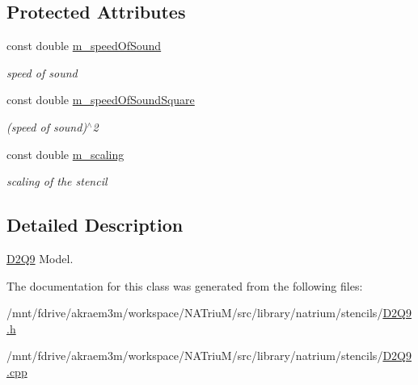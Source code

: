 \subsection*{Protected Attributes}
\begin{DoxyCompactItemize}
\item 
\hypertarget{classnatrium_1_1D2Q9_a056f2b554e1f2c8983a063096b9ebc5a}{
const double \hyperlink{classnatrium_1_1D2Q9_a056f2b554e1f2c8983a063096b9ebc5a}{m\_\-speedOfSound}}
\label{classnatrium_1_1D2Q9_a056f2b554e1f2c8983a063096b9ebc5a}

\begin{DoxyCompactList}\small\item\em speed of sound \item\end{DoxyCompactList}\item 
\hypertarget{classnatrium_1_1D2Q9_ad6ddec011506268204c2b2bd6fea58b8}{
const double \hyperlink{classnatrium_1_1D2Q9_ad6ddec011506268204c2b2bd6fea58b8}{m\_\-speedOfSoundSquare}}
\label{classnatrium_1_1D2Q9_ad6ddec011506268204c2b2bd6fea58b8}

\begin{DoxyCompactList}\small\item\em (speed of sound)$^\wedge$2 \item\end{DoxyCompactList}\item 
\hypertarget{classnatrium_1_1D2Q9_a94556f39daba9d3f3000b5eca23e0c0a}{
const double \hyperlink{classnatrium_1_1D2Q9_a94556f39daba9d3f3000b5eca23e0c0a}{m\_\-scaling}}
\label{classnatrium_1_1D2Q9_a94556f39daba9d3f3000b5eca23e0c0a}

\begin{DoxyCompactList}\small\item\em scaling of the stencil \item\end{DoxyCompactList}\end{DoxyCompactItemize}


\subsection{Detailed Description}
\hyperlink{classnatrium_1_1D2Q9}{D2Q9} Model. 

The documentation for this class was generated from the following files:\begin{DoxyCompactItemize}
\item 
/mnt/fdrive/akraem3m/workspace/NATriuM/src/library/natrium/stencils/\hyperlink{D2Q9_8h}{D2Q9.h}\item 
/mnt/fdrive/akraem3m/workspace/NATriuM/src/library/natrium/stencils/\hyperlink{D2Q9_8cpp}{D2Q9.cpp}\end{DoxyCompactItemize}
